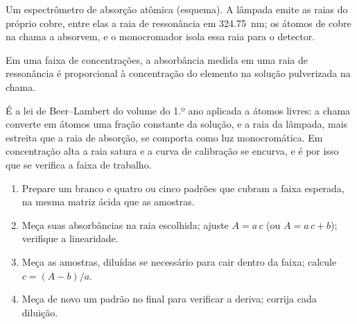 \begin{omfigure}
\par\vspace{4pt}

{\small Um espectrômetro de absorção atômica (esquema). A lâmpada emite as raias do próprio cobre, entre
elas a raia de ressonância em \qty{324.75}{nm}; os átomos de cobre na chama a absorvem, e o
monocromador isola essa raia para o detector.}
\end{omfigure}

\begin{proposition}\label{prop:b2:mass-spec-atomic:aas}
Em uma faixa de concentrações, a absorbância medida em uma raia de ressonância é proporcional à
concentração do elemento na solução pulverizada na chama.
\end{proposition}

\admitted

É a lei de Beer--Lambert do volume do 1.º ano aplicada a átomos livres: a chama converte em átomos uma
fração constante da solução, e a raia da lâmpada, mais estreita que a raia de absorção, se comporta como
luz monocromática. Em concentração alta a raia satura e a curva de calibração se encurva, e é por isso
que se verifica a faixa de trabalho.

\begin{method}\label{met:b2:mass-spec-atomic:aas-calibration}
\begin{enumerate}
  \item Prepare um branco e quatro ou cinco padrões que cubram a faixa esperada, na mesma matriz ácida
        que as amostras.
  \item Meça suas absorbâncias na raia escolhida; ajuste $A = a\,c$ (ou $A = a\,c + b$); verifique a
        linearidade.
  \item Meça as amostras, diluídas se necessário para cair dentro da faixa; calcule $c = (A - b)/a$.
  \item Meça de novo um padrão no final para verificar a deriva; corrija cada diluição.
\end{enumerate}
\end{method}


